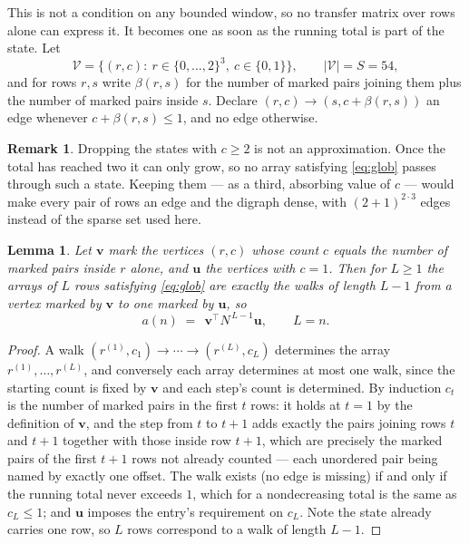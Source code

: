 \documentclass[11pt,a4paper]{article}
\theoremstyle{plain}
\newtheorem{lemma}[theorem]{Lemma}
\theoremstyle{definition}
\newtheorem{remark}[theorem]{Remark}
\begin{document}
This is not a condition on any bounded window, so no transfer matrix over rows alone can
express it. It becomes one as soon as the running total is part of the state. Let
\[
\mathcal V=\bigl\{(r,c):\ r\in\{0,\dots,2\}^{3},\ c\in\{0,1\}\bigr\},
\qquad |\mathcal V|=S=54,
\]
and for rows $r,s$ write $\beta(r,s)$ for the number of marked pairs joining them plus the
number of marked pairs inside $s$. Declare $(r,c)\to(s,c+\beta(r,s))$ an edge whenever
$c+\beta(r,s)\le1$, and no edge otherwise.

\begin{remark}
Dropping the states with $c\ge2$ is not an approximation. Once the total has reached two it
can only grow, so no array satisfying \eqref{eq:glob} passes through such a state. Keeping
them --- as a third, absorbing value of $c$ --- would make every pair of rows an edge and
the digraph dense, with $(2+1)^{2\cdot3}$ edges instead of the sparse set used here.
\end{remark}

\begin{lemma}\label{lem:walk}
Let $\mathbf{v}$ mark the vertices $(r,c)$ whose count $c$ equals the number of marked pairs
inside $r$ alone, and $\mathbf{u}$ the vertices with $c=1$. Then for $L\ge1$ the arrays
of $L$ rows satisfying \eqref{eq:glob} are exactly the walks of length $L-1$ from a
vertex marked by $\mathbf{v}$ to one marked by $\mathbf{u}$, so
\[
a(n)\;=\;\,\mathbf{v}^{\!\top}N^{\,L-1}\mathbf{u},\qquad L=n .
\]
\end{lemma}

\begin{proof}
A walk $(r^{(1)},c_1)\to\cdots\to(r^{(L)},c_L)$ determines the array
$r^{(1)},\dots,r^{(L)}$, and conversely each array determines at most one walk, since the
starting count is fixed by $\mathbf{v}$ and each step's count is determined. By induction
$c_t$ is the number of marked pairs in the first $t$ rows: it holds at $t=1$ by the
definition of $\mathbf{v}$, and the step from $t$ to $t+1$ adds exactly the pairs joining
rows $t$ and $t+1$ together with those inside row $t+1$, which are precisely the marked
pairs of the first $t+1$ rows not already counted --- each unordered pair being named by
exactly one offset. The walk exists (no edge is missing) if and only if the running total
never exceeds $1$, which for a nondecreasing total is the same as $c_L\le1$; and
$\mathbf{u}$ imposes the entry's requirement on $c_L$. Note the state already carries one
row, so $L$ rows correspond to a walk of length $L-1$.
\end{proof}
\end{document}
